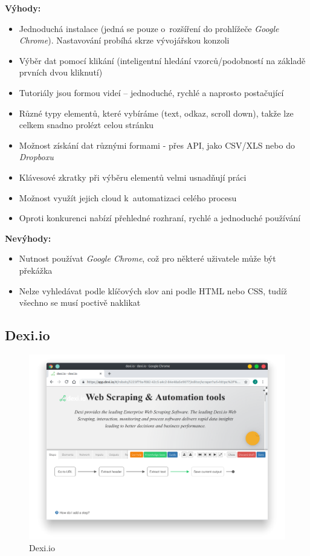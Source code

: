 \documentclass[thesis=B,czech]{FITthesis}[2012/06/26]
\begin{document}
\textbf{Výhody:}
\begin{itemize}
	\item Jednoduchá instalace (jedná se pouze o~rozšíření do prohlížeče \emph{Google Chrome}). Nastavování probíhá skrze vývojářskou konzoli
	\item Výběr dat pomocí klikání (inteligentní hledání vzorců/podobností na základě prvních dvou kliknutí)
	\item Tutoriály jsou formou videí -- jednoduché, rychlé a naprosto postačující
	\item Různé typy elementů, které vybíráme (text, odkaz, scroll down), takže lze celkem snadno prolézt celou stránku
	\item Možnost získání dat různými formami - přes API, jako CSV/XLS nebo do \emph{Dropboxu}
	\item Klávesové zkratky při výběru elementů velmi usnadňují práci
	\item Možnost využít jejich cloud k~automatizaci celého procesu
	\item Oproti konkurenci nabízí přehledné rozhraní, rychlé a jednoduché používání
\end{itemize}

\textbf{Nevýhody:}
\begin{itemize}
	\item Nutnost používat \emph{Google Chrome}, což pro některé uživatele může být překážka
	\item Nelze vyhledávat podle klíčových slov ani podle HTML nebo CSS, tudíž všechno se musí poctivě naklikat
\end{itemize}


\subsection{Dexi.io}
\begin{figure}[h!]
	\includegraphics[width=\linewidth]{images/Dexiio.png}
	\caption{Dexi.io}
	\label{fig:dexi.io}
\end{figure}
\end{document}
